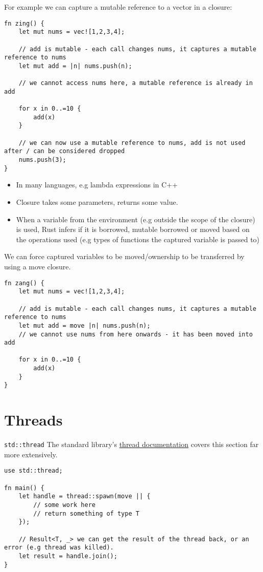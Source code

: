 For example we can capture a mutable reference to a vector in a closure:
\begin{verbatim}
fn zing() {
    let mut nums = vec![1,2,3,4];

    // add is mutable - each call changes nums, it captures a mutable reference to nums
    let mut add = |n| nums.push(n);

    // we cannot access nums here, a mutable reference is already in add
    
    for x in 0..=10 {
        add(x)
    }
    
    // we can now use a mutable reference to nums, add is not used after / can be considered dropped
    nums.push(3);
}
\end{verbatim}

\begin{itemize}
    \item In many languages, e.g lambda expressions in C++
    \item Closure takes some parameters, returns some value.
    \item When a variable from the environment (e.g outside the scope of the closure) is used, Rust infers if it is borrowed, mutable borrowed or moved based on the operations used (e.g types of functions the captured variable is passed to)
\end{itemize}
We can force captured variables to be moved/ownership to be transferred by using a move closure.
\begin{verbatim}
fn zang() {
    let mut nums = vec![1,2,3,4];

    // add is mutable - each call changes nums, it captures a mutable reference to nums
    let mut add = move |n| nums.push(n);
    // we cannot use nums from here onwards - it has been moved into add
    
    for x in 0..=10 {
        add(x)
    }
}
\end{verbatim}

\section{Threads}
\begin{sidenotebox}{\texttt{std::thread}}
    The standard library's \href{https://doc.rust-lang.org/std/thread/}{thread documentation} covers this section far more extensively.
\end{sidenotebox}
\begin{verbatim}
use std::thread;

fn main() {
    let handle = thread::spawn(move || {
        // some work here
        // return something of type T
    });

    // Result<T, _> we can get the result of the thread back, or an error (e.g thread was killed).
    let result = handle.join();
}
\end{verbatim}

